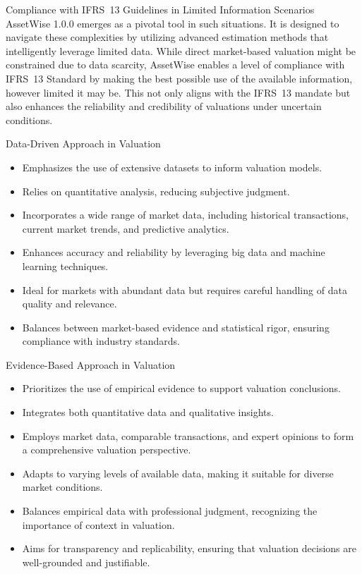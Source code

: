 \documentclass{beamer}
\begin{document}
\begin{frame}{Compliance with IFRS~13 Guidelines in Limited Information Scenarios}
	AssetWise 1.0.0 emerges as a pivotal tool in such situations. It is designed to navigate these complexities by utilizing advanced estimation methods that intelligently leverage limited data. While direct market-based valuation might be constrained due to data scarcity, AssetWise enables a level of compliance with IFRS~13 Standard by making the best possible use of the available information, however limited it may be. This not only aligns with the IFRS~13 mandate but also enhances the reliability and credibility of valuations under uncertain conditions.
\end{frame}

\begin{frame}{Data-Driven Approach in Valuation}
	\begin{itemize}
		\item Emphasizes the use of extensive datasets to inform valuation models.
		\item Relies on quantitative analysis, reducing subjective judgment.
		\item Incorporates a wide range of market data, including historical transactions, current market trends, and predictive analytics.
		\item Enhances accuracy and reliability by leveraging big data and machine learning techniques.
		\item Ideal for markets with abundant data but requires careful handling of data quality and relevance.
		\item Balances between market-based evidence and statistical rigor, ensuring compliance with industry standards.
	\end{itemize}
\end{frame}

\begin{frame}{Evidence-Based Approach in Valuation}
	\begin{itemize}
		\item Prioritizes the use of empirical evidence to support valuation conclusions.
		\item Integrates both quantitative data and qualitative insights.
		\item Employs market data, comparable transactions, and expert opinions to form a comprehensive valuation perspective.
		\item Adapts to varying levels of available data, making it suitable for diverse market conditions.
		\item Balances empirical data with professional judgment, recognizing the importance of context in valuation.
		\item Aims for transparency and replicability, ensuring that valuation decisions are well-grounded and justifiable.
	\end{itemize}
\end{frame}
\end{document}
